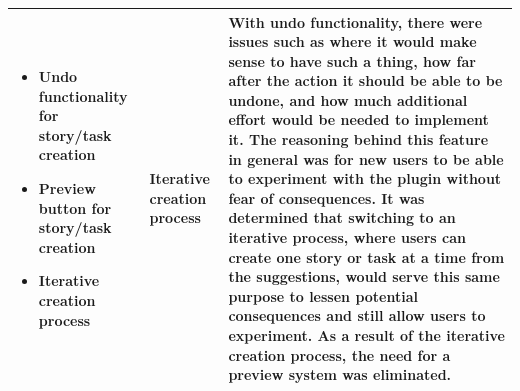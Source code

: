 \begin{table}[!h]
\begin{tabularx}{\textwidth}{|p{3cm}|p{3cm}|X|}
	\hline
	\begin{itemize}
		\item Undo functionality for story/task creation
		\item Preview button for story/task creation
		\item Iterative creation process
	\end{itemize} & 
	Iterative creation process & With undo functionality, there were issues such as where it would make sense to have such a thing, how far after the action it should be able to be undone, and how much additional effort would be needed to implement it. The reasoning behind this feature in general was for new users to be able to experiment with the plugin without fear of consequences. It was determined that switching to an iterative process, where users can create one story or task at a time from the suggestions, would serve this same purpose to lessen potential consequences and still allow users to experiment. As a result of the iterative creation process, the need for a preview system was eliminated.\\
	\hline
	\end{tabularx}
\label{tab:UIUXDesignChoices}
\end{table}